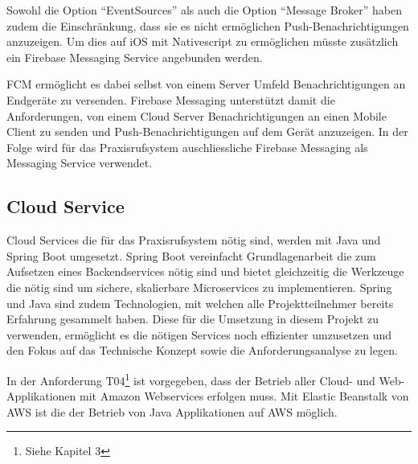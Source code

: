 
Sowohl die Option ``EventSources'' als auch die Option ``Message Broker'' haben zudem die Einschränkung, dass sie es nicht ermöglichen Push-Benachrichtigungen anzuzeigen.
Um dies auf iOS mit Nativescript zu ermöglichen müsste zusätzlich ein Firebase Messaging Service angebunden werden.

FCM ermöglicht es dabei selbst von einem Server Umfeld Benachrichtigungen an Endgeräte zu versenden.\cite{fcm-java}
Firebase Messaging unterstützt damit die Anforderungen, von einem Cloud Server Benachrichtigungen an einen Mobile Client zu senden und Push-Benachrichtigungen auf dem Gerät anzuzeigen.
In der Folge wird für das Praxisrufsystem auschliessliche Firebase Messaging als Messaging Service verwendet.

\subsection{Cloud Service}\label{subsec:cloud-service2}

Cloud Services die für das Praxisrufsystem nötig sind, werden mit Java und Spring Boot umgesetzt.
Spring Boot vereinfacht Grundlagenarbeit die zum Aufsetzen eines Backendservices nötig sind und bietet
gleichzeitig die Werkzeuge die nötig sind um sichere, skalierbare Microservices zu implementieren.\cite{why-spring}
Spring und Java sind zudem Technologien, mit welchen alle Projektteilnehmer bereits Erfahrung gesammelt haben.
Diese für die Umsetzung in diesem Projekt zu verwenden, ermöglicht es die nötigen Services noch effizienter umzusetzen
und den Fokus auf das Technische Konzept sowie die Anforderungsanalyse zu legen.

In der Anforderung T04\footnote{Siehe Kapitel 3} ist vorgegeben, dass der Betrieb aller Cloud- und Web-Applikationen mit Amazon Webservices erfolgen muss.
Mit Elastic Beanstalk von AWS ist die der Betrieb von Java Applikationen auf AWS möglich.\cite{aws-spring-java}


